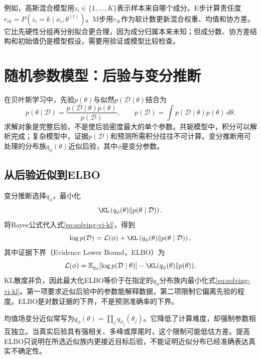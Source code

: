 例如，高斯混合模型用$z_i\in\{1,\ldots,K\}$表示样本来自哪个成分。E步计算责任度$r_{ik}=P(z_i=k\mid x_i,\theta^{(t)})$。M步用$r_{ik}$作为软计数更新混合权重、均值和协方差。它比先硬性分组再分别拟合更合理，因为成分归属本来未知；但成分数、协方差结构和初始值仍是模型假设，需要用验证或模型比较检查。

\section{随机参数模型：后验与变分推断}

在贝叶斯学习中，先验$p(\theta)$与似然$p(\mathcal D\mid\theta)$结合为
\begin{equation}
 p(\theta\mid\mathcal D)=\frac{p(\mathcal D\mid\theta)p(\theta)}{p(\mathcal D)},
 \qquad p(\mathcal D)=\int p(\mathcal D\mid\theta)p(\theta)\,d\theta.
 \label{eq:solving-posterior}
\end{equation}
求解对象是完整后验，不是使后验密度最大的单个参数。共轭模型中，积分可以解析完成；复杂模型中，证据$p(\mathcal D)$和预测所需积分往往不可计算。变分推断用可处理的分布族$q_\phi(\theta)$近似后验，其中$\phi$是变分参数。

\subsection{从后验近似到ELBO}
变分推断选择$q_\phi$，最小化
\begin{equation}
 \KL\left(q_\phi(\theta)\|p(\theta\mid\mathcal D)\right).
 \label{eq:solving-vi-kl}
\end{equation}
将Bayes公式代入式\eqref{eq:solving-vi-kl}，得到
\begin{equation}
 \log p(\mathcal D)=\mathcal L(\phi)+
 \KL\left(q_\phi(\theta)\|p(\theta\mid\mathcal D)\right),
\end{equation}
其中证据下界（Evidence Lower Bound，ELBO）为
\begin{equation}
 \mathcal L(\phi)=\mathbb E_{q_\phi}[\log p(\mathcal D\mid\theta)]
 -\KL(q_\phi(\theta)\|p(\theta)).
 \label{eq:solving-elbo}
\end{equation}
KL散度非负，因此最大化ELBO等价于在指定的$q_\phi$分布族内最小化式\eqref{eq:solving-vi-kl}。第一项要求近似后验中的参数能解释数据，第二项限制它偏离先验的程度。ELBO是对数证据的下界，不是预测准确率的下界。

均值场变分近似常写为$q_\phi(\theta)=\prod_jq_{\phi_j}(\theta_j)$。它降低了计算难度，却强制参数相互独立。当真实后验具有强相关、多峰或厚尾时，这个限制可能低估方差。提高ELBO只说明在所选近似族内更接近目标后验，不能证明近似分布已经准确表达真实不确定性。

